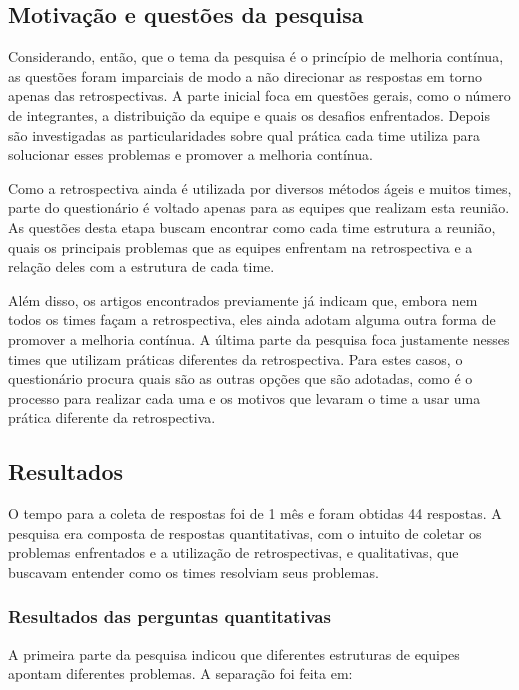 \subsection{Motivação e questões da pesquisa}

Considerando, então, que o tema da pesquisa é o princípio de melhoria contínua, as questões foram imparciais de modo a não direcionar as respostas em torno apenas das retrospectivas. A parte inicial foca em questões gerais, como o número de integrantes, a distribuição da equipe e quais os desafios enfrentados. Depois são investigadas as particularidades sobre qual prática cada time utiliza para solucionar esses problemas e promover a melhoria contínua. 

Como a retrospectiva ainda é utilizada por diversos métodos ágeis e muitos times, parte do questionário é voltado apenas para as equipes que realizam esta reunião. As questões desta etapa buscam encontrar como cada time estrutura a reunião, quais os principais problemas que as equipes enfrentam na retrospectiva e a relação deles com a estrutura de cada time. 

Além disso, os artigos encontrados previamente já indicam que, embora nem todos os times façam a retrospectiva, eles ainda adotam alguma outra forma de promover a melhoria contínua. A última parte da pesquisa foca justamente nesses times que utilizam práticas diferentes da retrospectiva. Para estes casos, o questionário procura quais são as outras opções que são adotadas, como é o processo para realizar cada uma e os motivos que levaram o time a usar uma prática diferente da retrospectiva.

\subsection{Resultados}

O tempo para a coleta de respostas foi de 1 mês e foram obtidas 44 respostas. A pesquisa era composta de respostas quantitativas, com o intuito de coletar os problemas enfrentados e a utilização de retrospectivas, e qualitativas, que buscavam entender como os times resolviam seus problemas.

\subsubsection*{Resultados das perguntas quantitativas}

A primeira parte da pesquisa indicou que diferentes estruturas de equipes apontam diferentes problemas. A separação foi feita em: 
  

